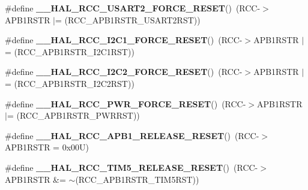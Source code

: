 \begin{DoxyCompactItemize}
\mbox{\label{group___r_c_c___a_p_b1___force___release___reset_gab4de80173ffa0e599baab0e76d562cc3}} 
\#define {\bfseries \+\_\+\+\_\+\+H\+A\+L\+\_\+\+R\+C\+C\+\_\+\+U\+S\+A\+R\+T2\+\_\+\+F\+O\+R\+C\+E\+\_\+\+R\+E\+S\+ET}()~(R\+CC-\/$>$A\+P\+B1\+R\+S\+TR $\vert$= (R\+C\+C\+\_\+\+A\+P\+B1\+R\+S\+T\+R\+\_\+\+U\+S\+A\+R\+T2\+R\+ST))
\item 
\mbox{\label{group___r_c_c___a_p_b1___force___release___reset_ga551c171f88af86ca985db634ac9e3275}} 
\#define {\bfseries \+\_\+\+\_\+\+H\+A\+L\+\_\+\+R\+C\+C\+\_\+\+I2\+C1\+\_\+\+F\+O\+R\+C\+E\+\_\+\+R\+E\+S\+ET}()~(R\+CC-\/$>$A\+P\+B1\+R\+S\+TR $\vert$= (R\+C\+C\+\_\+\+A\+P\+B1\+R\+S\+T\+R\+\_\+\+I2\+C1\+R\+ST))
\item 
\mbox{\label{group___r_c_c___a_p_b1___force___release___reset_gaed404dfdc9bc032cf718b7ed17f664f0}} 
\#define {\bfseries \+\_\+\+\_\+\+H\+A\+L\+\_\+\+R\+C\+C\+\_\+\+I2\+C2\+\_\+\+F\+O\+R\+C\+E\+\_\+\+R\+E\+S\+ET}()~(R\+CC-\/$>$A\+P\+B1\+R\+S\+TR $\vert$= (R\+C\+C\+\_\+\+A\+P\+B1\+R\+S\+T\+R\+\_\+\+I2\+C2\+R\+ST))
\item 
\mbox{\label{group___r_c_c___a_p_b1___force___release___reset_gaf454341fae45fdfacfea2f45c07ce3e0}} 
\#define {\bfseries \+\_\+\+\_\+\+H\+A\+L\+\_\+\+R\+C\+C\+\_\+\+P\+W\+R\+\_\+\+F\+O\+R\+C\+E\+\_\+\+R\+E\+S\+ET}()~(R\+CC-\/$>$A\+P\+B1\+R\+S\+TR $\vert$= (R\+C\+C\+\_\+\+A\+P\+B1\+R\+S\+T\+R\+\_\+\+P\+W\+R\+R\+ST))
\item 
\mbox{\label{group___r_c_c___a_p_b1___force___release___reset_ga9d0742ab271ace3dbe1a4e83de3d017b}} 
\#define {\bfseries \+\_\+\+\_\+\+H\+A\+L\+\_\+\+R\+C\+C\+\_\+\+A\+P\+B1\+\_\+\+R\+E\+L\+E\+A\+S\+E\+\_\+\+R\+E\+S\+ET}()~(R\+CC-\/$>$A\+P\+B1\+R\+S\+TR = 0x00\+U)
\item 
\mbox{\label{group___r_c_c___a_p_b1___force___release___reset_gaf7e0cde5ea8f6425d87ebf2d91e8b360}} 
\#define {\bfseries \+\_\+\+\_\+\+H\+A\+L\+\_\+\+R\+C\+C\+\_\+\+T\+I\+M5\+\_\+\+R\+E\+L\+E\+A\+S\+E\+\_\+\+R\+E\+S\+ET}()~(R\+CC-\/$>$A\+P\+B1\+R\+S\+TR \&= $\sim$(R\+C\+C\+\_\+\+A\+P\+B1\+R\+S\+T\+R\+\_\+\+T\+I\+M5\+R\+ST))

\end{DoxyCompactItemize}
